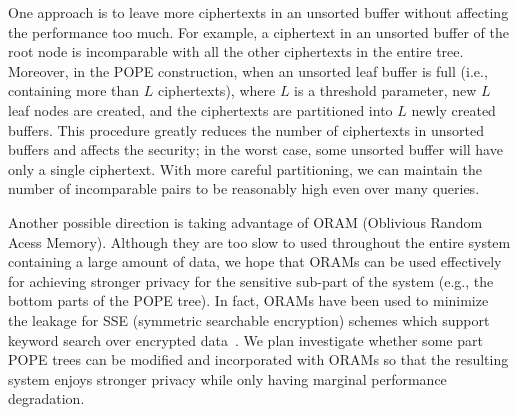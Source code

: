 One approach is to leave more ciphertexts in an unsorted buffer without
affecting the performance too much. For example, a ciphertext in an unsorted
buffer of the root node is incomparable with all the other ciphertexts in the
entire tree.  Moreover, in the POPE construction, when an unsorted leaf buffer
is full (i.e.,  containing more than $L$ ciphertexts), where $L$ is a threshold
parameter, new $L$ leaf nodes are created, and the ciphertexts are partitioned
into $L$ newly created buffers. This procedure greatly reduces the number of
ciphertexts in unsorted buffers and affects the security; in the worst case,
some unsorted buffer will have only a single ciphertext. With more careful
partitioning, we can maintain the number of incomparable pairs to be reasonably
high even over many queries. 


Another possible direction is taking advantage of ORAM (Oblivious Random Acess
Memory). Although they are too slow to used throughout the entire system
containing a large amount of data, we hope that ORAMs can be used effectively
for achieving stronger privacy for the sensitive sub-part of the system (e.g.,
the bottom parts of the POPE tree).  In fact, ORAMs have been used to minimize
the leakage for SSE (symmetric searchable encryption) schemes which support
keyword search over encrypted data~\cite{NDSS:StePapShi14,C:GarMohPap16}. We
plan investigate whether some part POPE trees can be modified and incorporated
with ORAMs so that the resulting system enjoys stronger privacy while only
having marginal performance degradation.  



